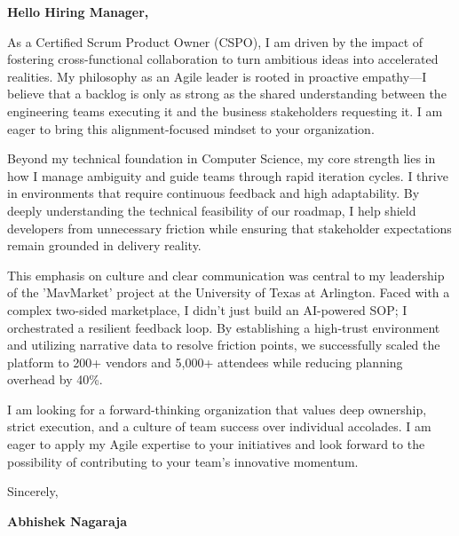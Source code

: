\documentclass[11pt,letterpaper]{article} %
\begin{document}
\vspace{1.5em}

\textbf{Hello Hiring Manager,}

As a Certified Scrum Product Owner (CSPO), I am driven by the impact of fostering cross-functional collaboration to turn ambitious ideas into accelerated realities. My philosophy as an Agile leader is rooted in proactive empathy—I believe that a backlog is only as strong as the shared understanding between the engineering teams executing it and the business stakeholders requesting it. I am eager to bring this alignment-focused mindset to your organization.

Beyond my technical foundation in Computer Science, my core strength lies in how I manage ambiguity and guide teams through rapid iteration cycles. I thrive in environments that require continuous feedback and high adaptability. By deeply understanding the technical feasibility of our roadmap, I help shield developers from unnecessary friction while ensuring that stakeholder expectations remain grounded in delivery reality.

This emphasis on culture and clear communication was central to my leadership of the 'MavMarket' project at the University of Texas at Arlington. Faced with a complex two-sided marketplace, I didn't just build an AI-powered SOP; I orchestrated a resilient feedback loop. By establishing a high-trust environment and utilizing narrative data to resolve friction points, we successfully scaled the platform to 200+ vendors and 5,000+ attendees while reducing planning overhead by 40\%.

I am looking for a forward-thinking organization that values deep ownership, strict execution, and a culture of team success over individual accolades. I am eager to apply my Agile expertise to your initiatives and look forward to the possibility of contributing to your team's innovative momentum.

\vspace{1.5em}
Sincerely,

\vspace{1.2em} %
\textbf{Abhishek Nagaraja}
\end{document}
